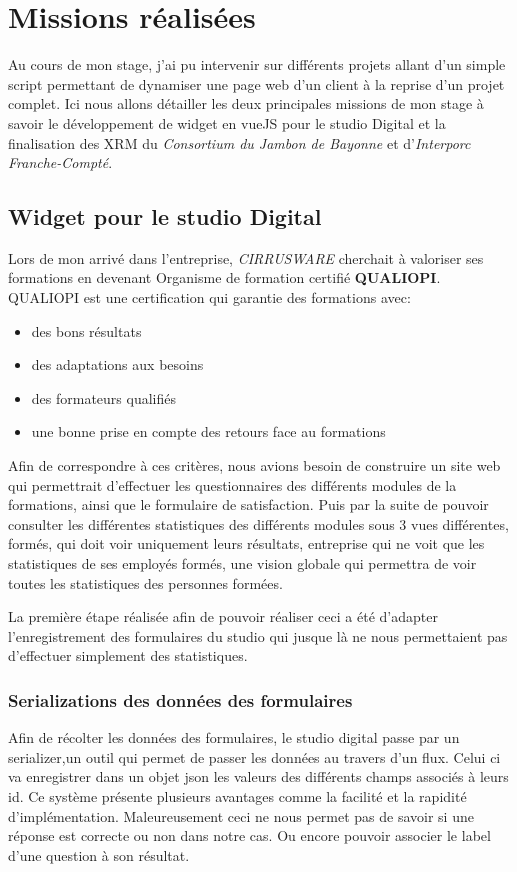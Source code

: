 \section{Missions réalisées}
Au cours de mon stage, j'ai pu intervenir sur différents projets allant d'un simple script permettant de dynamiser une page web d'un client à la reprise d'un projet complet. Ici nous allons détailler les deux principales missions de mon stage à savoir le développement de widget en vueJS pour le studio Digital et la finalisation des XRM du \textit{Consortium du Jambon de Bayonne} et d'\textit{Interporc Franche-Compté}.

\subsection{Widget pour le studio Digital}
Lors de mon arrivé dans l'entreprise, \textit{CIRRUSWARE} cherchait à valoriser ses formations en devenant Organisme de formation certifié \textbf{QUALIOPI}. QUALIOPI est une certification qui garantie des formations avec: 
\begin{itemize}
    \item des bons résultats
    \item des adaptations aux besoins
    \item des formateurs qualifiés
    \item une bonne prise en compte des retours face au formations
\end{itemize} 
Afin de correspondre à ces critères, nous avions besoin de construire un site web qui permettrait d'effectuer les questionnaires des différents modules de la formations, ainsi que le formulaire de satisfaction. Puis par la suite de pouvoir consulter les différentes statistiques des différents modules sous 3 vues différentes, formés, qui doit voir uniquement leurs résultats, entreprise qui ne voit que les statistiques de ses employés formés, une vision globale qui permettra de voir toutes les statistiques des personnes formées.

La première étape réalisée afin de pouvoir réaliser ceci a été d'adapter l'enregistrement des formulaires du studio qui jusque là ne nous permettaient pas d'effectuer simplement des statistiques. 

\subsubsection{Serializations des données des formulaires}

Afin de récolter les données des formulaires, le studio digital passe par un serializer,un outil qui permet de passer les données au travers d'un flux. Celui ci va enregistrer dans un objet json les valeurs des différents champs associés à leurs id. Ce système présente plusieurs avantages comme la facilité et la rapidité d'implémentation. Maleureusement ceci ne nous permet pas de savoir si une réponse est correcte ou non dans notre cas. Ou encore pouvoir associer le label d'une question à son résultat. 

